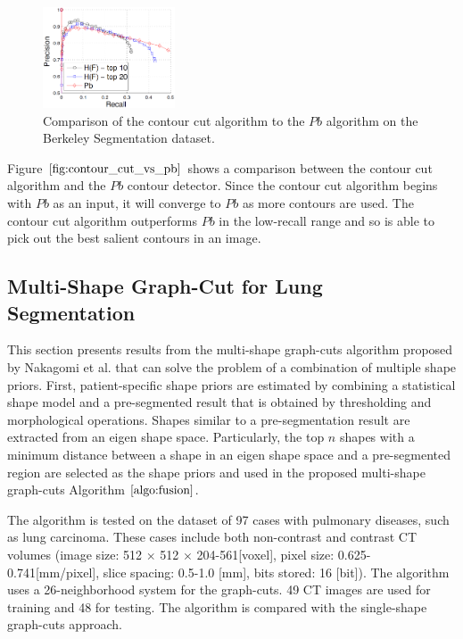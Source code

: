 \documentclass{SMBV12}
\begin{document}
\begin{figure}[htbp]
\centering
\includegraphics[width=0.35\textwidth]{images/contour_cut_result.png}
\caption{Comparison of the contour cut algorithm to the $Pb$ algorithm on the Berkeley Segmentation dataset.}
\label{fig:contour_cut_vs_pb}
\end{figure}

Figure $\ref{fig:contour_cut_vs_pb}$ shows a comparison between the contour cut algorithm and the $Pb$ contour detector. Since the contour cut algorithm begins with $Pb$ as an input, it will converge to $Pb$ as more contours are used. The contour cut algorithm outperforms $Pb$ in the low-recall range and so is able to pick out the best salient contours in an image.

\subsection{Multi-Shape Graph-Cut for Lung Segmentation}

This section presents results from the multi-shape graph-cuts algorithm proposed by Nakagomi et al. \cite{nakagomimulti} that can solve the problem of a combination of multiple shape priors. First, patient-specific shape priors are estimated by combining a statistical shape model and a pre-segmented result that is obtained by thresholding and morphological operations. Shapes similar to a pre-segmentation result are extracted from an eigen shape space. Particularly, the top $n$ shapes with a minimum distance between a shape in an eigen shape space and a pre-segmented region are selected as the shape priors and used in the proposed multi-shape graph-cuts Algorithm $\ref{algo:fusion}$.

The algorithm is tested on the dataset of 97 cases with pulmonary diseases, such as lung carcinoma. These cases include both non-contrast and contrast CT volumes (image size: 512 $\times$ 512 $\times$ 204-561[voxel], pixel size: 0.625-0.741[mm/pixel], slice spacing: 0.5-1.0 [mm], bits stored: 16 [bit]). The algorithm uses a 26-neighborhood system for the graph-cuts. 49 CT images are used for training and 48 for testing. The algorithm is compared with the single-shape graph-cuts approach.
\end{document}
